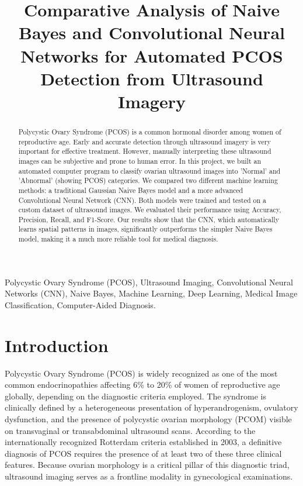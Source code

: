\documentclass[conference]{IEEEtran}
\begin{document}
\title{Comparative Analysis of Naive Bayes and Convolutional Neural Networks for Automated PCOS Detection from Ultrasound Imagery}

\author{
}

\maketitle

\begin{abstract}
Polycystic Ovary Syndrome (PCOS) is a common hormonal disorder among women of reproductive age. Early and accurate detection through ultrasound imagery is very important for effective treatment. However, manually interpreting these ultrasound images can be subjective and prone to human error. In this project, we built an automated computer program to classify ovarian ultrasound images into 'Normal' and 'Abnormal' (showing PCOS) categories. We compared two different machine learning methods: a traditional Gaussian Naive Bayes model and a more advanced Convolutional Neural Network (CNN). Both models were trained and tested on a custom dataset of ultrasound images. We evaluated their performance using Accuracy, Precision, Recall, and F1-Score. Our results show that the CNN, which automatically learns spatial patterns in images, significantly outperforms the simpler Naive Bayes model, making it a much more reliable tool for medical diagnosis.
\end{abstract}

\begin{IEEEkeywords}
Polycystic Ovary Syndrome (PCOS), Ultrasound Imaging, Convolutional Neural Networks (CNN), Naive Bayes, Machine Learning, Deep Learning, Medical Image Classification, Computer-Aided Diagnosis.
\end{IEEEkeywords}

\section{Introduction}
Polycystic Ovary Syndrome (PCOS) is widely recognized as one of the most common endocrinopathies affecting 6\% to 20\% of women of reproductive age globally, depending on the diagnostic criteria employed. The syndrome is clinically defined by a heterogeneous presentation of hyperandrogenism, ovulatory dysfunction, and the presence of polycystic ovarian morphology (PCOM) visible on transvaginal or transabdominal ultrasound scans. According to the internationally recognized Rotterdam criteria established in 2003, a definitive diagnosis of PCOS requires the presence of at least two of these three clinical features. Because ovarian morphology is a critical pillar of this diagnostic triad, ultrasound imaging serves as a frontline modality in gynecological examinations. 
\end{document}
